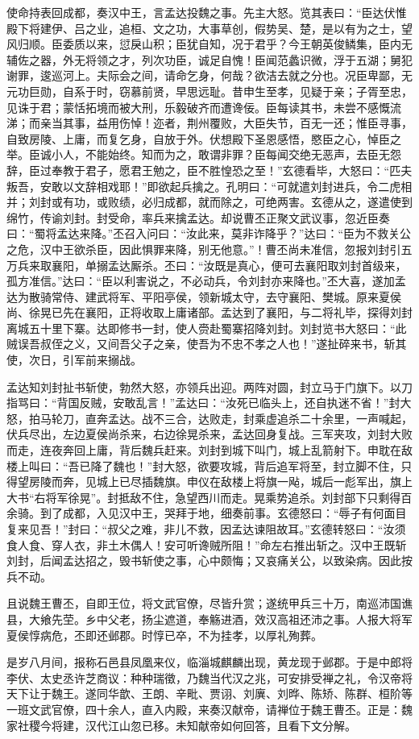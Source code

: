 使命持表回成都，奏汉中王，言孟达投魏之事。先主大怒。览其表曰：“臣达伏惟殿下将建伊、吕之业，追桓、文之功，大事草创，假势吴、楚，是以有为之士，望风归顺。臣委质以来，愆戾山积；臣犹自知，况于君乎？今王朝英俊鳞集，臣内无辅佐之器，外无将领之才，列次功臣，诚足自愧！臣闻范蠡识微，浮于五湖；舅犯谢罪，逡巡河上。夫际会之间，请命乞身，何哉？欲洁去就之分也。况臣卑鄙，无元功巨勋，自系于时，窃慕前贤，早思远耻。昔申生至孝，见疑于亲；子胥至忠，见诛于君；蒙恬拓境而被大刑，乐毅破齐而遭谗佞。臣每读其书，未尝不感慨流涕；而亲当其事，益用伤悼！迩者，荆州覆败，大臣失节，百无一还；惟臣寻事，自致房陵、上庸，而复乞身，自放于外。伏想殿下圣恩感悟，愍臣之心，悼臣之举。臣诚小人，不能始终。知而为之，敢谓非罪？臣每闻交绝无恶声，去臣无怨辞，臣过奉教于君子，愿君王勉之，臣不胜惶恐之至！”玄德看毕，大怒曰：“匹夫叛吾，安敢以文辞相戏耶！”即欲起兵擒之。孔明曰：“可就遣刘封进兵，令二虎相并；刘封或有功，或败绩，必归成都，就而除之，可绝两害。玄德从之，遂遣使到绵竹，传谕刘封。封受命，率兵来擒孟达。却说曹丕正聚文武议事，忽近臣奏曰：“蜀将孟达来降。”丕召入问曰：“汝此来，莫非诈降乎？”达曰：“臣为不救关公之危，汉中王欲杀臣，因此惧罪来降，别无他意。”！曹丕尚未准信，忽报刘封引五万兵来取襄阳，单搦孟达厮杀。丕曰：“汝既是真心，便可去襄阳取刘封首级来，孤方准信。”达曰：“臣以利害说之，不必动兵，令刘封亦来降也。”丕大喜，遂加孟达为散骑常侍、建武将军、平阳亭侯，领新城太守，去守襄阳、樊城。原来夏侯尚、徐晃已先在襄阳，正将收取上庸诸部。孟达到了襄阳，与二将礼毕，探得刘封离城五十里下寨。达即修书一封，使人赍赴蜀寨招降刘封。刘封览书大怒曰：“此贼误吾叔侄之义，又间吾父子之亲，使吾为不忠不孝之人也！”遂扯碎来书，斩其使，次日，引军前来搦战。

孟达知刘封扯书斩使，勃然大怒，亦领兵出迎。两阵对圆，封立马于门旗下。以刀指骂曰：“背国反贼，安敢乱言！”孟达曰：“汝死已临头上，还自执迷不省！”封大怒，拍马轮刀，直奔孟达。战不三合，达败走，封乘虚追杀二十余里，一声喊起，伏兵尽出，左边夏侯尚杀来，右边徐晃杀来，孟达回身复战。三军夹攻，刘封大败而走，连夜奔回上庸，背后魏兵赶来。刘封到城下叫门，城上乱箭射下。申耽在敌楼上叫曰：“吾已降了魏也！”封大怒，欲要攻城，背后追军将至，封立脚不住，只得望房陵而奔，见城上已尽插魏旗。申仪在敌楼上将旗一飐，城后一彪军出，旗上大书“右将军徐晃”。封抵敌不住，急望西川而走。晃乘势追杀。刘封部下只剩得百余骑。到了成都，入见汉中王，哭拜于地，细奏前事。玄德怒曰：“辱子有何面目复来见吾！”封曰：“叔父之难，非儿不救，因孟达谏阻故耳。”玄德转怒曰：“汝须食人食、穿人衣，非土木偶人！安可听谗贼所阻！”命左右推出斩之。汉中王既斩刘封，后闻孟达招之，毁书斩使之事，心中颇悔；又哀痛关公，以致染病。因此按兵不动。

且说魏王曹丕，自即王位，将文武官僚，尽皆升赏；遂统甲兵三十万，南巡沛国谯县，大飨先茔。乡中父老，扬尘遮道，奉觞进酒，效汉高祖还沛之事。人报大将军夏侯惇病危，丕即还邺郡。时惇已卒，不为挂孝，以厚礼殉葬。

是岁八月间，报称石邑县凤凰来仪，临淄城麒麟出现，黄龙现于邺郡。于是中郎将李伏、太史丞许芝商议：种种瑞徵，乃魏当代汉之兆，可安排受禅之礼，令汉帝将天下让于魏王。遂同华歆、王朗、辛毗、贾诩、刘廙、刘晔、陈矫、陈群、桓阶等一班文武官僚，四十余人，直入内殿，来奏汉献帝，请禅位于魏王曹丕。正是：魏家社稷今将建，汉代江山忽已移。未知献帝如何回答，且看下文分解。